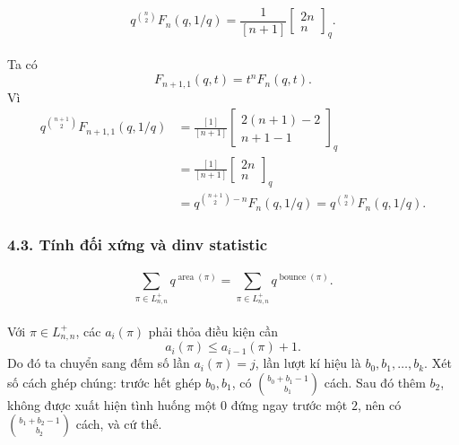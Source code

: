 \documentclass[11pt]{article}
\begin{document}
\paragraph{}
\[
  q^{\binom{n}{2}}F_n(q,1/q)
  =
  \frac{1}{[n+1]}
  \left[\begin{matrix}2n\\ n\end{matrix}\right]_q.
\]

\paragraph{}
Ta có
\[
  F_{n+1,1}(q,t)=t^nF_n(q,t).
\]
Vì
\[
\begin{aligned}
  q^{\binom{n+1}{2}}F_{n+1,1}(q,1/q)
  &=
  \frac{[1]}{[n+1]}
  \left[\begin{matrix}2(n+1)-2\\ n+1-1\end{matrix}\right]_q  \\
  &=
  \frac{[1]}{[n+1]}
  \left[\begin{matrix}2n\\ n\end{matrix}\right]_q            \\
  &=
  q^{\binom{n+1}{2}-n}F_n(q,1/q)
  =
  q^{\binom{n}{2}}F_n(q,1/q).
\end{aligned}
\]


\subsubsection*{4.3. Tính đối xứng và dinv statistic}

\paragraph{}
\[
  \sum_{\pi\in L^+_{n,n}}q^{\operatorname{area}(\pi)}
  =
  \sum_{\pi\in L^+_{n,n}}q^{\operatorname{bounce}(\pi)}.
\]

\paragraph{}
Với \(\pi\in L^+_{n,n}\), các \(a_i(\pi)\) phải thỏa điều kiện cần
\[
  a_i(\pi)\le a_{i-1}(\pi)+1.
\]
Do đó ta chuyển sang đếm số lần \(a_i(\pi)=j\), lần lượt kí hiệu là
\(b_0,b_1,\ldots,b_k\). Xét số cách ghép chúng: trước hết ghép \(b_0,b_1\),
có \(\binom{b_0+b_1-1}{b_1}\) cách. Sau đó thêm \(b_2\), không được xuất hiện
tình huống một \(0\) đứng ngay trước một \(2\), nên có
\(\binom{b_1+b_2-1}{b_2}\) cách, và cứ thế.
\end{document}
